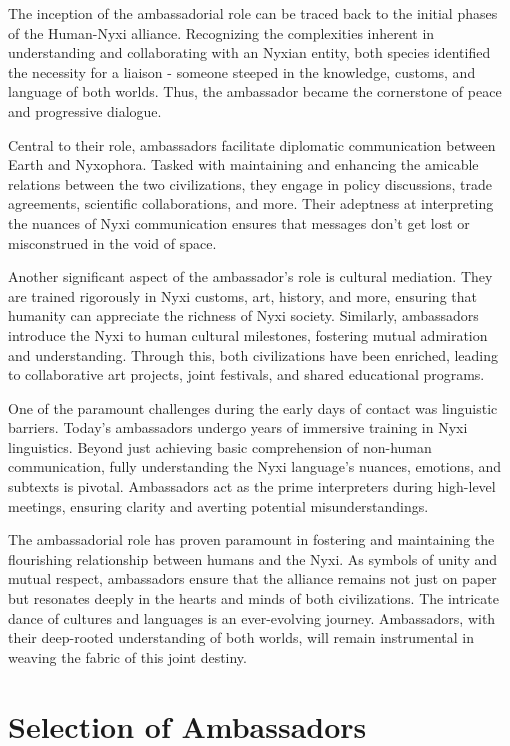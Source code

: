 The inception of the ambassadorial role can be traced back to the initial
phases of the Human-Nyxi alliance. Recognizing the complexities inherent in
understanding and collaborating with an Nyxian entity, both species identified
the necessity for a liaison - someone steeped in the knowledge, customs, and
language of both worlds. Thus, the ambassador became the cornerstone of peace
and progressive dialogue.

Central to their role, ambassadors facilitate diplomatic communication between
Earth and Nyxophora. Tasked with maintaining and enhancing the amicable
relations between the two civilizations, they engage in policy discussions,
trade agreements, scientific collaborations, and more. Their adeptness at
interpreting the nuances of Nyxi communication ensures that messages don't get
lost or misconstrued in the void of space.

Another significant aspect of the ambassador's role is cultural mediation. They
are trained rigorously in Nyxi customs, art, history, and more, ensuring that
humanity can appreciate the richness of Nyxi society. Similarly, ambassadors
introduce the Nyxi to human cultural milestones, fostering mutual admiration
and understanding. Through this, both civilizations have been enriched, leading
to collaborative art projects, joint festivals, and shared educational
programs.

One of the paramount challenges during the early days of contact was linguistic
barriers. Today's ambassadors undergo years of immersive training in Nyxi
linguistics. Beyond just achieving basic comprehension of non-human
communication, fully understanding the Nyxi language's nuances, emotions, and
subtexts is pivotal. Ambassadors act as the prime interpreters during
high-level meetings, ensuring clarity and averting potential misunderstandings.

The ambassadorial role has proven paramount in fostering and maintaining the
flourishing relationship between humans and the Nyxi. As symbols of unity and
mutual respect, ambassadors ensure that the alliance remains not just on paper
but resonates deeply in the hearts and minds of both civilizations. The
intricate dance of cultures and languages is an ever-evolving journey.
Ambassadors, with their deep-rooted understanding of both worlds, will remain
instrumental in weaving the fabric of this joint destiny.

\section{Selection of Ambassadors}

